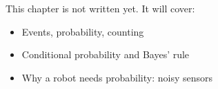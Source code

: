 \label{ch:prob}
\begin{keyidea}
This chapter is not written yet. It will cover:
\begin{itemize}[nosep]
  \item Events, probability, counting
  \item Conditional probability and Bayes' rule
  \item Why a robot needs probability: noisy sensors
\end{itemize}
\end{keyidea}

